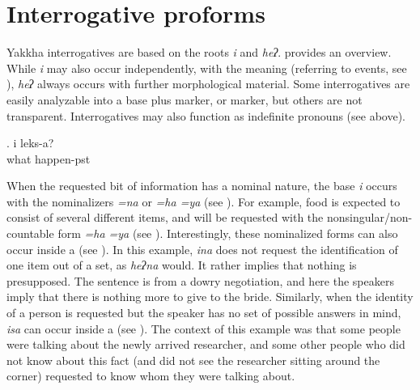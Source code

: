 \section{Interrogative proforms}\label{interr}

Yakkha interrogatives are based on the roots \emph{i} and \emph{heʔ}.  provides an overview. While \emph{i} may also occur independently, with the meaning  (referring to events, see \Next),  \emph{heʔ} always occurs with further morphological material. Some interrogatives are easily analyzable into a base plus  marker,  or  marker, but others are not transparent. Interrogatives may also function as indefinite pronouns (see  above).
\largerpage 

	\exg. i leks-a?\\
		what	happen{\sc [3sg]-pst}\\




When the requested bit of information has a nominal nature, the base \emph{i} occurs with the nominalizers \emph{=na} or  \emph{=ha \ti =ya} (see ). For example, food is expected to consist of several different items, and will be requested with the nonsingular/non-countable form \emph{=ha \ti =ya} (see \Next[a]). Interestingly, these nominalized forms can also occur inside a  (see \Next[b]). In this example, \emph{ina} does not request  the identification of one item out of a set, as \emph{heʔna}  would. It rather implies that nothing is presupposed. The sentence is from a dowry negotiation, and here the speakers imply that there is nothing more to give to the bride. Similarly, when the identity of a person is requested but the speaker has no set of possible answers in mind, \emph{isa} can occur inside a  (see \Next[c]). The context of this example was that some people were talking about the newly arrived researcher, and some other people who did not know about this fact (and did not see the researcher sitting around the corner) requested to know whom they were talking about.

